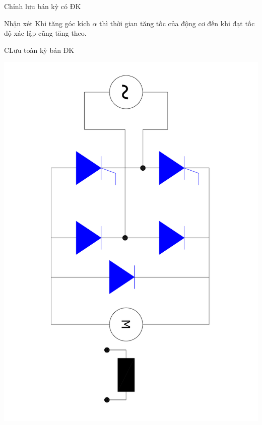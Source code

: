 \documentclass[24pt]{beamer}
\begin{document}
\begin{frame}{Chỉnh lưu bán kỳ có ĐK}
	\begin{block}{Nhận xét}
		\justifying
		Khi \alert{tăng góc kích $\alpha$} thì \alert{thời gian tăng tốc} của động cơ đến khi đạt tốc độ xác lập cũng \alert{tăng theo}.
	\end{block}
\end{frame}
\begin{frame}{CLưu toàn kỳ bán ĐK}
	\begin{center}
		\vspace{-.7cm}
		\includegraphics[scale=.35, angle=90]{images-chude6/chinh-luu-cau-1pha-ban-dieu-khien-bat-doi-xung-tai-motor-DC.pdf} 
	\end{center}
\end{frame}
\end{document}
